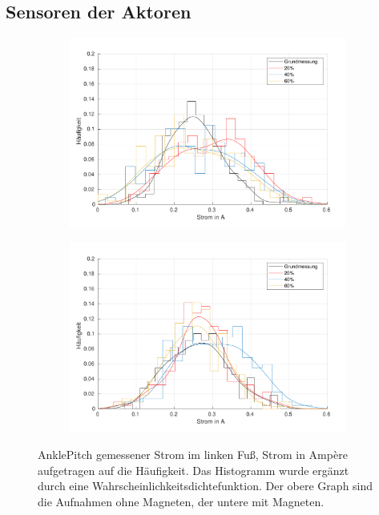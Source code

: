 \FloatBarrier
\subsection{Sensoren der Aktoren}

\begin{figure}[tb]
	\centering
		\begin{subfigure}[c]{.9\linewidth}
			\centering
			\includegraphics[width=\linewidth]{Bilder/links_Current_AnklePitch_ohneM.pdf}
		\end{subfigure}
		\begin{subfigure}[c]{.9\linewidth}
			\centering
			\includegraphics[width=\linewidth]{Bilder/links_Current_AnklePitch_mitM.pdf}
		\end{subfigure}
	\caption{AnklePitch gemessener Strom im linken Fuß, Strom in Ampère aufgetragen auf die Häufigkeit. Das Histogramm wurde ergänzt durch eine Wahrscheinlichkeitsdichtefunktion. Der obere Graph sind die Aufnahmen ohne Magneten, der untere mit Magneten.} \label{AnklePitch_Current_links}
\end{figure}
